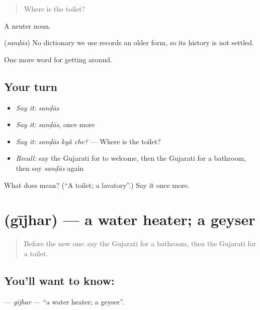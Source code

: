 \begin{quote}
Where is the toilet?
\end{quote}

A neuter noun.

\begin{cousinweb}
\textbf{} (\emph{sanḍās}) No dictionary we use records an older form, so its history is not settled.
\end{cousinweb}

\begin{grammarlens}[title={What you've built}]
One more word for getting around.
\end{grammarlens}

\subsection*{Your turn}
\begin{itemize}
\raggedright
  \item \emph{Say it:} \emph{sanḍās}
  \item \emph{Say it:} \emph{sanḍās}, once more
  \item \emph{Say it:} \emph{sanḍās kyā̃ che?} — Where is the toilet?
  \item \emph{Recall:} say the Gujarati for to welcome, then the Gujarati for a bathroom, then say \emph{sanḍās} again
\end{itemize}

\begin{tcolorbox}[breakable,colback=teal!4,colframe=teal!35!black,title={Before you move on}]
What does  mean? (\textquotedblleft{}A toilet; a lavatory\textquotedblright{}.) Say it once more.
\end{tcolorbox}
\section[\texorpdfstring{\gu{ગીઝર} (gījhar)}{ગીઝર (gījhar)}]{ (gījhar) — a water heater; a geyser}

\label{lesson:GU-C410-gijhar}



\begin{quote}
Before the new one: say the Gujarati for a bathroom, then the Gujarati for a toilet.
\end{quote}

\subsection*{You'll want to know: }
\textbf{} — \emph{gījhar} — \textquotedblleft{}a water heater; a geyser\textquotedblright{}.

